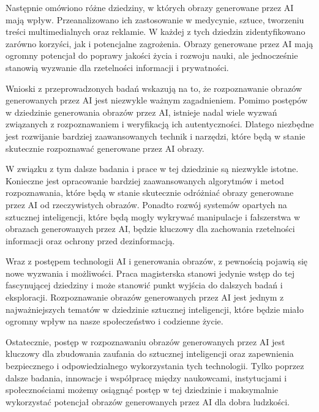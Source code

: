 \documentclass[11pt,a4paper,twoside,openright]{bookest}
\begin{document}
    Następnie omówiono różne dziedziny, w których obrazy generowane przez AI mają wpływ.
    Przeanalizowano ich zastosowanie w medycynie, sztuce, tworzeniu treści multimedialnych oraz reklamie.
    W każdej z tych dziedzin zidentyfikowano zarówno korzyści, jak i potencjalne zagrożenia.
    Obrazy generowane przez AI mają ogromny potencjał do poprawy jakości życia i rozwoju nauki, ale jednocześnie stanowią wyzwanie dla rzetelności informacji i prywatności.

    Wnioski z przeprowadzonych badań wskazują na to, że rozpoznawanie obrazów generowanych przez AI jest niezwykle ważnym zagadnieniem.
    Pomimo postępów w dziedzinie generowania obrazów przez AI, istnieje nadal wiele wyzwań związanych z rozpoznawaniem i weryfikacją ich autentyczności.
    Dlatego niezbędne jest rozwijanie bardziej zaawansowanych technik i narzędzi, które będą w stanie skutecznie rozpoznawać generowane przez AI obrazy.

    W związku z tym dalsze badania i prace w tej dziedzinie są niezwykle istotne.
    Konieczne jest opracowanie bardziej zaawansowanych algorytmów i metod rozpoznawania, które będą w stanie skutecznie odróżniać obrazy generowane przez AI od rzeczywistych obrazów.
    Ponadto rozwój systemów opartych na sztucznej inteligencji, które będą mogły wykrywać manipulacje i fałszerstwa w obrazach generowanych przez AI, będzie kluczowy dla zachowania rzetelności informacji oraz ochrony przed dezinformacją.

    Wraz z postępem technologii AI i generowania obrazów, z pewnością pojawią się nowe wyzwania i możliwości.
    Praca magisterska stanowi jedynie wstęp do tej fascynującej dziedziny i może stanowić punkt wyjścia do dalszych badań i eksploracji.
    Rozpoznawanie obrazów generowanych przez AI jest jednym z najważniejszych tematów w dziedzinie sztucznej inteligencji, które będzie miało ogromny wpływ na nasze społeczeństwo i codzienne życie.

    Ostatecznie, postęp w rozpoznawaniu obrazów generowanych przez AI jest kluczowy dla zbudowania zaufania do sztucznej inteligencji oraz zapewnienia bezpiecznego i odpowiedzialnego wykorzystania tych technologii.
    Tylko poprzez dalsze badania, innowacje i współpracę między naukowcami, instytucjami i społecznościami możemy osiągnąć postęp w tej dziedzinie i maksymalnie wykorzystać potencjał obrazów generowanych przez AI dla dobra ludzkości.

    
    
\end{document}
